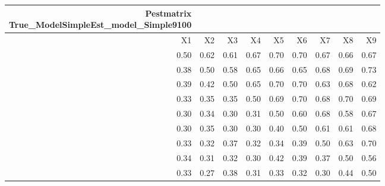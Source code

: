 \begin{longtable}{rrrrrrrrr}
\caption*{
{\large Pestmatrix} \\ 
{\small True\_ModelSimpleEst\_model\_Simple9100}
} \\ 
\toprule
X1 & X2 & X3 & X4 & X5 & X6 & X7 & X8 & X9 \\ 
\midrule
0.50 & 0.62 & 0.61 & 0.67 & 0.70 & 0.70 & 0.67 & 0.66 & 0.67 \\ 
0.38 & 0.50 & 0.58 & 0.65 & 0.66 & 0.65 & 0.68 & 0.69 & 0.73 \\ 
0.39 & 0.42 & 0.50 & 0.65 & 0.70 & 0.70 & 0.63 & 0.68 & 0.62 \\ 
0.33 & 0.35 & 0.35 & 0.50 & 0.69 & 0.70 & 0.68 & 0.70 & 0.69 \\ 
0.30 & 0.34 & 0.30 & 0.31 & 0.50 & 0.60 & 0.68 & 0.58 & 0.67 \\ 
0.30 & 0.35 & 0.30 & 0.30 & 0.40 & 0.50 & 0.61 & 0.61 & 0.68 \\ 
0.33 & 0.32 & 0.37 & 0.32 & 0.34 & 0.39 & 0.50 & 0.63 & 0.70 \\ 
0.34 & 0.31 & 0.32 & 0.30 & 0.42 & 0.39 & 0.37 & 0.50 & 0.56 \\ 
0.33 & 0.27 & 0.38 & 0.31 & 0.33 & 0.32 & 0.30 & 0.44 & 0.50 \\ 
\bottomrule
\end{longtable}

